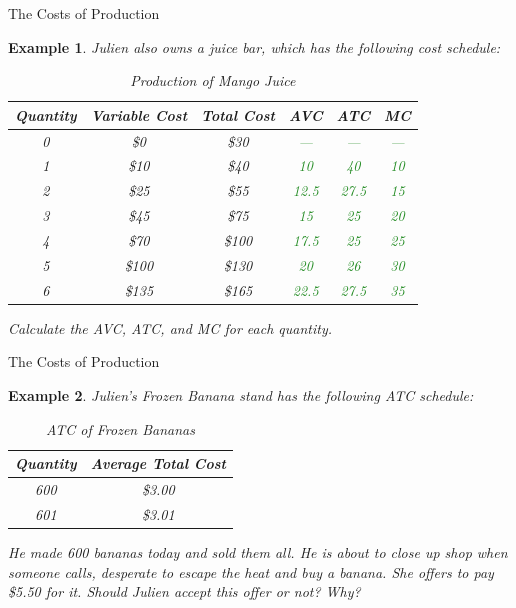\documentclass[xcolor={dvipsnames},pdf, hyperref={colorlinks=true, citecolor=ForestGreen, linkcolor=BlueViolet, urlcolor=Magenta}]{beamer}
\newtheorem{exmp}{Example}[section]
\newcommand{\ddp}[1]{{\textcolor{ForestGreen}{#1}}}
\begin{document}
\begin{frame}{The Costs of Production}
	\begin{exmp} Julien also owns a juice bar, which has the following cost schedule:
		
		\begin{table}[H]
			\centering
			\caption{Production of Mango Juice}
			\begin{tabular}{ c|c|c|c|c|c}        
				
				Quantity & Variable Cost & Total Cost & AVC & ATC & MC \\
				\hline
				0 & \$0 &\$30 & \ddp{---} & \ddp{---} & \ddp{---} \\
				1 & \$10 & \$40 & \ddp{10} & \ddp{40} & \ddp{10} \\
				2 & \$25 & \$55 & \ddp{12.5} & \ddp{27.5} & \ddp{15}\\
				3 & \$45 & \$75 & \ddp{15} & \ddp{25} & \ddp{20} \\
				4 & \$70 & \$100 & \ddp{17.5} & \ddp{25} & \ddp{25} \\
				5 & \$100 & \$130 &  \ddp{20} & \ddp{26} & \ddp{30} \\
				6 & \$135 & \$165 &  \ddp{22.5} & \ddp{27.5} & \ddp{35}\\
			\end{tabular}
		\end{table} 
		
		Calculate the AVC, ATC, and MC for each quantity.
	\end{exmp}
\end{frame}

\begin{frame}{The Costs of Production}
	\begin{exmp}
		Julien's Frozen Banana stand has the following ATC schedule:
		
		\begin{table}[ht]
			\centering
			\caption{ATC of Frozen Bananas}
			\begin{tabular}{ c|c}        
				
				Quantity & Average Total Cost \\
				\hline
				600 & \$3.00 \\
				601 & \$3.01 \\
			\end{tabular}
		\end{table} 
		He made 600 bananas today and sold them all. He is about to close up shop when someone calls, desperate to escape the heat and buy a banana. She offers to pay \$5.50 for it. Should Julien accept this offer or not? Why?
	\end{exmp} 
\pause	\ddp{$MB = MR = \$5.50.$ $MC = 9.01$. Nope, don't sell since $MC>MB$.}
\end{frame}
\end{document}

